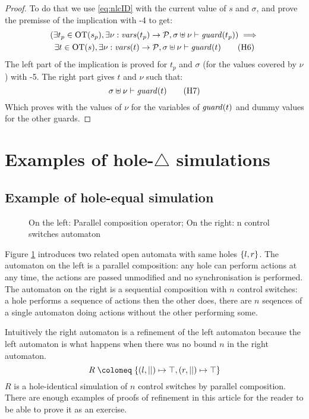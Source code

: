 \documentclass{article}
\begin{document}
\begin{proof}
	To do that we use \eqref{eq:nlcID} with the current value of \(s\) and \(\sigma\), and prove the premisse of the implication with \hyp{4} to get:
	\begin{multline}
		\mpar{\exists t_p \in \fOT{s_p}, \exists \nu: \fvars{t_p} \to \values, \sigma \uplus \nu \vdash \fguard{t_p}} \implies \\
		\exists t \in \fOT{s}, \exists \nu: \fvars{t} \to \values, \sigma \uplus \nu \vdash \fguard{t} \hyp{6}
	\end{multline}
	The left part of the implication is proved for \(t_p\) and \(\sigma\) (for the values covered by \(\nu\)) with \hyp{5}.
	The right part gives \(t\) and \(\nu\) such that:
	\[ \sigma \uplus \nu \vdash \fguard{t} \hyp{7} \]
	Which proves  with the values of \(\nu\) for the variables of \(\mathit{guard}{\left(t\right)}\) and dummy values for the other guards.
\end{proof}


\section{Examples of hole-\(\triangle\) simulations}\label{apx:refrel}

\subsection{Example of hole-equal simulation}
\begin{exi}
\begin{figure}
\centering

\vrule

\caption{On the left: Parallel composition operator; On the right: n control switches automaton}
\label{fig:hisim}
\end{figure}
Figure \ref{fig:hisim} introduces two related open automata with same holes \({\left\{l, r\right\}}\).
The automaton on the left is a parallel composition: any hole can perform actions at any time, the actions are passed unmodified and no synchronisation is performed.
The automaton on the right is a sequential composition with \(n\) control switches: a hole performs a sequence of actions then the other does, there are \(n\) seqences of a single automaton doing actions without the other performing some.

Intuitively the right automaton is a refinement of the left automaton because the left automaton is what happens when there was no bound \(n\) in the right automaton.
\[ R \defobject \mbrc{\mpar{l, ||} \mapsto \top, \mpar{r, ||} \mapsto \top} \]
\(R\) is a hole-identical simulation of \(n\) control switches by parallel composition.
There are enough examples of proofs of refinement in this article for the reader to be able to prove it as an exercise.
\end{exi}
\end{document}
